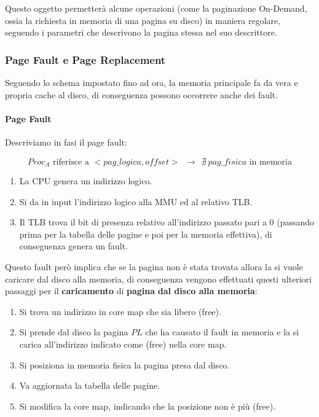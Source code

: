 \documentclass{article}
\begin{document}
Questo oggetto permetterà alcune operazioni (come la paginazione On-Demand, ossia la richiesta in memoria di una pagina su disco) in maniera regolare, seguendo i parametri che descrivono la pagina stessa nel suo descrittore.

\newpage

\subsubsection{Page Fault e Page Replacement}

Seguendo lo schema impostato fino ad ora, la memoria principale fa da vera e propria cache al disco, di conseguenza possono occorrere anche dei fault.

\paragraph{Page Fault} Descriviamo in fasi il page fault:

\[ Proc_{A} \text{ riferisce a } < pag\_logica, offset > \:\: \rightarrow \:\: \nexists \: pag\_fisica \text{ in memoria} \]

\begin{enumerate}
    \item La CPU genera un indirizzo logico.
    \item Si da in input l'indirizzo logico alla MMU ed al relativo TLB.
    \item Il TLB trova il bit di presenza relativo all'indirizzo passato pari a $0$ (passando prima per la tabella delle pagine e poi per la memoria effettiva), di conseguenza genera un fault.
\end{enumerate}

Questo fault però implica che se la pagina non è stata trovata allora la si vuole caricare dal disco alla memoria, di conseguenza vengono effettuati questi ulteriori passaggi per il \textbf{caricamento} di \textbf{pagina} \textbf{dal disco alla memoria}:

\begin{enumerate}
    \item Si trova un indirizzo in core map che sia libero (free).
    \item Si prende dal disco la pagina $PL$ che ha causato il fault in memoria e la si carica all'indirizzo indicato come (free) nella core map.
    \item Si posiziona in memoria fisica la pagina presa dal disco.
    \item Va aggiornata la tabella delle pagine.
    \item Si modifica la core map, indicando che la posizione non è più (free).
\end{enumerate}
\end{document}
